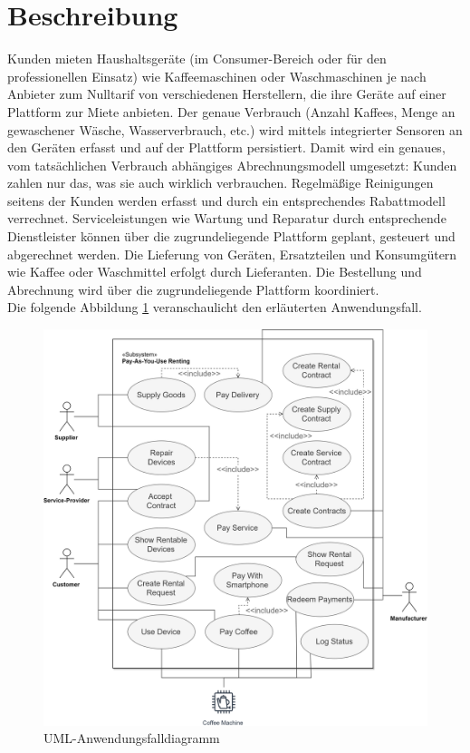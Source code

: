 \section{Beschreibung}
\label{sec:iot_usecase:description}
Kunden mieten Haushaltsgeräte (im Consumer-Bereich oder für den professionellen Einsatz) wie Kaffeemaschinen oder Waschmaschinen je nach Anbieter zum Nulltarif von verschiedenen Herstellern, die ihre Geräte auf einer Plattform zur Miete anbieten. Der genaue Verbrauch (Anzahl Kaffees, Menge an gewaschener Wäsche, Wasserverbrauch, etc.) wird mittels integrierter Sensoren an den Geräten erfasst und auf der Plattform persistiert. Damit wird ein genaues, vom tatsächlichen Verbrauch abhängiges Abrechnungsmodell umgesetzt: Kunden zahlen nur das, was sie auch wirklich verbrauchen. Regelmäßige Reinigungen seitens der Kunden werden erfasst und durch ein entsprechendes Rabattmodell verrechnet. Serviceleistungen wie Wartung und Reparatur durch entsprechende Dienstleister können über die zugrundeliegende Plattform geplant, gesteuert und abgerechnet werden. Die Lieferung von Geräten, Ersatzteilen und Konsumgütern wie Kaffee oder Waschmittel erfolgt durch Lieferanten. Die Bestellung und Abrechnung wird über die zugrundeliegende Plattform koordiniert.\\
Die folgende Abbildung \ref{fig:chapter04:usecase} veranschaulicht den erläuterten Anwendungsfall.



\begin{figure}[htbp]
 \centering
 \includegraphics[width=1.0\textwidth]{gfx/UML_Usecase.png}
 \caption{UML-Anwendungsfalldiagramm}
 \label{fig:chapter04:usecase}
\end{figure}


